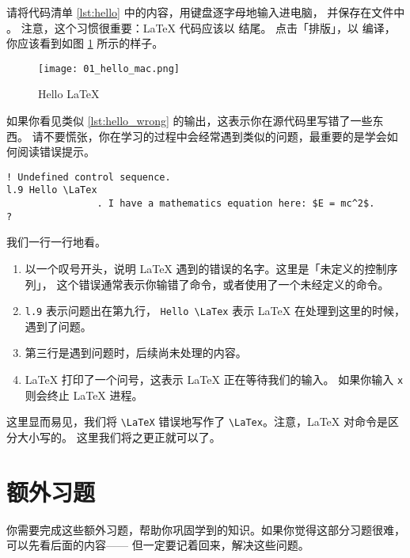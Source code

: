 请将代码清单 \ref{lst:hello} 中的内容，用键盘逐字母地输入进电脑，
并保存在文件中 。
注意，这个习惯很重要：\LaTeX{} 代码应该以  结尾。
点击「排版」，以 \XeLaTeX{} 编译，你应该看到如图 \ref{fig:hello} 所示的样子。

\begin{figure}[!htb]
\centering
\texttt{[image: 01\_hello\_mac.png]}
\caption{Hello \LaTeX{}}\label{fig:hello}
\end{figure}

如果你看见类似 \ref{lst:hello_wrong} 的输出，这表示你在源代码里写错了一些东西。
请不要慌张，你在学习的过程中会经常遇到类似的问题，最重要的是学会如何阅读错误提示。

\begin{lstlisting}[style = lltx, caption = {错误输出}, label = {lst:hello_wrong}]
! Undefined control sequence.
l.9 Hello \LaTex
                . I have a mathematics equation here: $E = mc^2$.
?
\end{lstlisting}

我们一行一行地看。

\begin{enumerate}
  \item 以一个叹号开头，说明 \LaTeX{} 遇到的错误的名字。这里是「未定义的控制序列」，
  这个错误通常表示你输错了命令，或者使用了一个未经定义的命令。
  \item \lstinline[style = iltx]|l.9| 表示问题出在第九行，
  \lstinline[style = iltx]|Hello \LaTex| 表示 \LaTeX{}
  在处理到这里的时候，遇到了问题。
  \item 第三行是遇到问题时，后续尚未处理的内容。
  \item \LaTeX{} 打印了一个问号，这表示 \LaTeX{} 正在等待我们的输入。
  如果你输入 \lstinline[style = iltx]|x| 则会终止 \LaTeX{} 进程。
\end{enumerate}

这里显而易见，我们将 \lstinline[style = iltx]|\LaTeX| 错误地写作了
\lstinline[style = iltx]|\LaTex|。注意，\LaTeX{} 对命令是区分大小写的。
这里我们将之更正就可以了。

\section{额外习题}

你需要完成这些额外习题，帮助你巩固学到的知识。如果你觉得这部分习题很难，可以先看后面的内容——
但一定要记着回来，解决这些问题。

